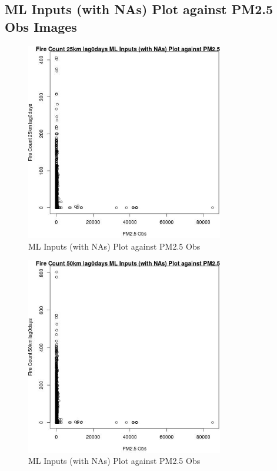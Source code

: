 
\subsection{ML Inputs (with NAs) Plot against PM2.5 Obs Images} 
 

\begin{figure} 
\centering  
\includegraphics[width=0.77\textwidth]{Code_Outputs/Report_ML_input_PM25_Step4_part_f_de_duplicated_aves_prioritize_24hr_obswNAs_Fire_Count_25km_lag0daysvPM25_Obs.jpg} 
\caption{\label{fig:Report_ML_input_PM25_Step4_part_f_de_duplicated_aves_prioritize_24hr_obswNAsFire_Count_25km_lag0daysvPM25_Obs}ML Inputs (with NAs) Plot against PM2.5 Obs} 
\end{figure} 
 

\begin{figure} 
\centering  
\includegraphics[width=0.77\textwidth]{Code_Outputs/Report_ML_input_PM25_Step4_part_f_de_duplicated_aves_prioritize_24hr_obswNAs_Fire_Count_50km_lag0daysvPM25_Obs.jpg} 
\caption{\label{fig:Report_ML_input_PM25_Step4_part_f_de_duplicated_aves_prioritize_24hr_obswNAsFire_Count_50km_lag0daysvPM25_Obs}ML Inputs (with NAs) Plot against PM2.5 Obs} 
\end{figure} 
 

